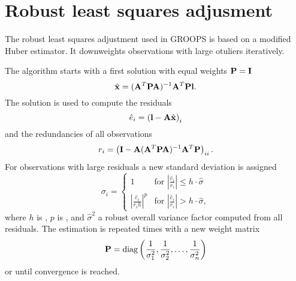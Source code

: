 \section{Robust least squares adjusment}\label{fundamentals.robustLeastSquares}
The robust least squares adjustment used in GROOPS is based on a modified Huber
estimator. It downweights observations with large otuliers iteratively.

The algorithm starts with a first solution with equal weights $\mathbf{P} =\mathbf{I}$
\begin{equation}
  \hat{\mathbf{x}} = (\mathbf{A}^T\mathbf{P}\mathbf{A})^{-1}\mathbf{A}^T\mathbf{P}\mathbf{l}.
\end{equation}
The solution is used to compute the residuals
\begin{equation}
  \hat{e}_i = \left(\mathbf{l} - \mathbf{A} \hat{\mathbf{x}}\right)_i
\end{equation}
and the redundancies of all observations
\begin{equation}
  r_i = \left(\mathbf{I} - \mathbf{A}(\mathbf{A}^T\mathbf{P}\mathbf{A})^{-1}\mathbf{A}^T\mathbf{P}\right)_{ii}.
\end{equation}
For observations with large residuals a new standard deviation is assigned
\begin{equation}
  \sigma_i =
  \begin{cases}
    1                                     & \text{for } \left|\frac{\hat{e}_i}{r_i}\right| \le h\cdot\hat{\sigma} \\
    \left|\frac{\hat{e}_i}{r_ih}\right|^p & \text{for } \left|\frac{\hat{e}_i}{r_i}\right| > h\cdot\hat{\sigma},
  \end{cases}
\end{equation}
where $h$ is , $p$ is , and $\hat{\sigma}^2$ a robust overall variance factor
computed from all residuals.
The estimation is repeated  times with a new weight matrix
\begin{equation}
  \mathbf{P} = \text{diag}\left(\frac{1}{\sigma_1^2}, \frac{1}{\sigma_2^2}, \ldots, \frac{1}{\sigma_n^2}\right)
\end{equation}
 or until convergence is reached.
